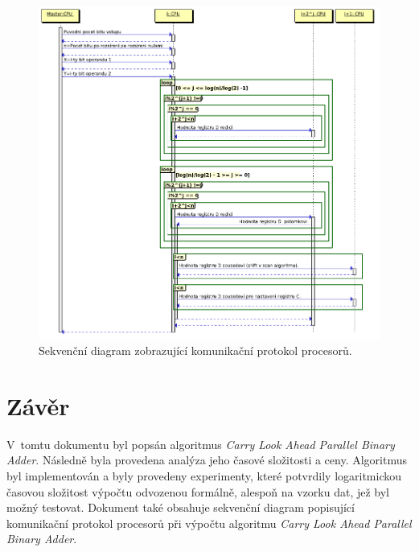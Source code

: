\documentclass[a4paper, 12pt]{article}
\begin{document}
\begin{figure}[bt]
\begin{center}
    \includegraphics[scale=0.65]{seq.png}
    \caption{Sekvenční diagram zobrazující komunikační protokol procesorů.}
    \label{fig:seq}
\end{center}
\end{figure}

\section{Závěr}
V~tomtu dokumentu byl popsán algoritmus \emph{Carry Look Ahead Parallel Binary Adder}.
Následně byla provedena analýza jeho časové složitosti a ceny.
Algoritmus byl implementován a byly provedeny experimenty,
které potvrdily logaritmickou časovou složitost výpočtu odvozenou formálně,
alespoň na vzorku dat, jež byl možný testovat.
Dokument také obsahuje sekvenční diagram popisující komunikační protokol procesorů
při výpočtu algoritmu \emph{Carry Look Ahead Parallel Binary Adder}.
\end{document}
